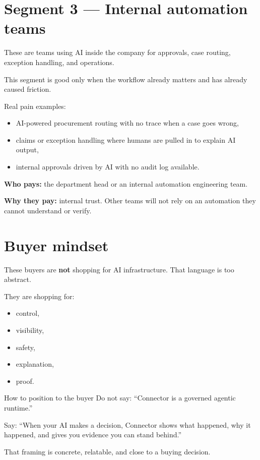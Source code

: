 \section{Segment 3 --- Internal automation teams}

These are teams using AI inside the company for approvals, case routing, exception handling, and operations.

This segment is good only when the workflow already matters and has already caused friction.

Real pain examples:

\begin{itemize}
  \item AI-powered procurement routing with no trace when a case goes wrong,
  \item claims or exception handling where humans are pulled in to explain AI output,
  \item internal approvals driven by AI with no audit log available.
\end{itemize}

\textbf{Who pays:} the department head or an internal automation engineering team.

\textbf{Why they pay:} internal trust. Other teams will not rely on an automation they cannot understand or verify.

\section{Buyer mindset}

These buyers are \textbf{not} shopping for AI infrastructure.
That language is too abstract.

They are shopping for:

\begin{itemize}
  \item control,
  \item visibility,
  \item safety,
  \item explanation,
  \item proof.
\end{itemize}

\begin{insightbox}{How to position to the buyer}
Do not say: ``Connector is a governed agentic runtime.''

Say: ``When your AI makes a decision, Connector shows what happened, why it happened, and gives you evidence you can stand behind.''
\end{insightbox}

That framing is concrete, relatable, and close to a buying decision.
